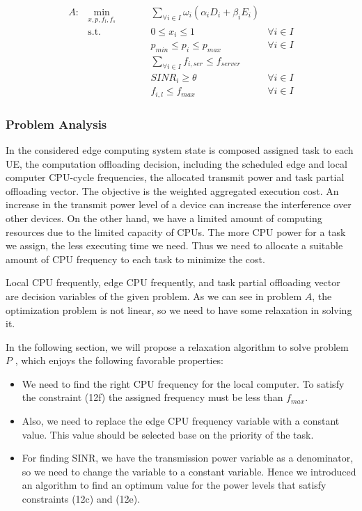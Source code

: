 \documentclass[12pt,final,3p]{CSP}
\begin{document}
\begin{subequations}
\begin{alignat}{2}
A: &\!\min_{x,p,f_l,f_s}        &\qquad& \sum_{\forall i \in I} \omega_i (\alpha_iD_i + \beta_iE_i)&\\
&\text{s.t.} &      & 0 \leq x_i \leq 1& \forall i \in I \\
& &      & p_{min} \leq p_i \leq  p_{max} & \forall i \in I \\
& &      & \sum_{\forall i \in I} f_{i,ser} \leq f_{server} & \\
& &      & SINR_i \geq \theta & \forall i \in I \\
& &      & f_{i,l} \leq f_{max}& \forall i \in I  
\label{eq:main}
\end{alignat}
\end{subequations}

\subsubsection{Problem Analysis}
In the considered edge computing system state is composed assigned task to each UE, the computation offloading decision, including the scheduled edge and local computer CPU-cycle frequencies, the allocated transmit power and task partial offloading vector. The objective is the weighted aggregated execution cost. An increase in the transmit power level of a device can increase the interference over other devices. On the other hand, we have a limited amount of computing resources due to the limited capacity of CPUs. The more CPU power for a task we assign, the less executing time we need. Thus we need to allocate a suitable amount of CPU frequency to each task to minimize the cost. 

Local CPU frequently, edge CPU frequently, and task partial offloading vector are decision variables of the given problem. As we can see in problem $A$, the optimization problem is not linear, so we need to have some relaxation in solving it.

In the following section, we will propose a relaxation algorithm to solve problem $P$ , which enjoys the following favorable properties:

\begin{itemize}
    \item We need to find the right CPU frequency for the local computer. To satisfy the constraint (12f) the assigned frequency must be less than $f_{max}$.
    \item Also, we need to replace the edge CPU frequency variable with a constant value. This value should be selected base  on the priority of the task.
    \item For finding SINR, we have the transmission power variable as a denominator, so we need to change the variable to a constant variable. Hence we introduced an algorithm to find an optimum value for the power levels that satisfy constraints (12c) and (12e).
\end{itemize}
\end{document}
